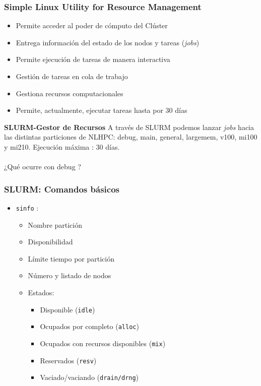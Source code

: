 \documentclass[aspectratio=169,professionalfonts]{beamer}
\begin{document}
\begin{frame}[fragile]
\frametitle{\textbf{Simple Linux Utility for Resource Management}}
\begin{itemize}
    \item  Permite acceder al poder de cómputo del Clúster
    \vspace{0.5em} 
    \item Entrega información del estado de los nodos y tareas (\textit{jobs})
    \vspace{0.5em} 
    \item Permite ejecución de tareas de manera interactiva 
    \vspace{0.5em} 
    \item Gestión de tareas en cola de trabajo 
    \vspace{0.5em} 
    \item Gestiona recursos computacionales 
    \vspace{0.5em} 
    \item Permite, actualmente, ejecutar tareas hasta por 30 días
    
\end{itemize}
    
\end{frame}

\begin{frame}{\textbf{SLURM-Gestor de Recursos}}
A través de SLURM podemos lanzar \textit{jobs} hacia las distintas particiones de NLHPC: debug, main, general, largemem, v100, mi100 y mi210. Ejecución máxima : 30 días. \\\\ 
\vspace{0.5em}
¿Qué ocurre con debug ?
    
\end{frame}


\begin{frame}[fragile]
\frametitle{\textbf{SLURM: Comandos básicos}}
\begin{itemize}
    \item \texttt{sinfo} : 
    \begin{itemize}
        \item Nombre partición
        \item Disponibilidad
        \item Límite tiempo por partición
        \item Número y listado de nodos
        \item Estados:
        \begin{itemize}
            \item Disponible (\texttt{idle})
            \item Ocupados por completo (\texttt{alloc})
            \item Ocupados con recursos disponibles (\texttt{mix})
            \item Reservados (\texttt{resv})
            \item Vaciado/vaciando (\texttt{drain/drng})
        \end{itemize}
        
    \end{itemize}
\end{itemize}
\end{frame}
\end{document}
